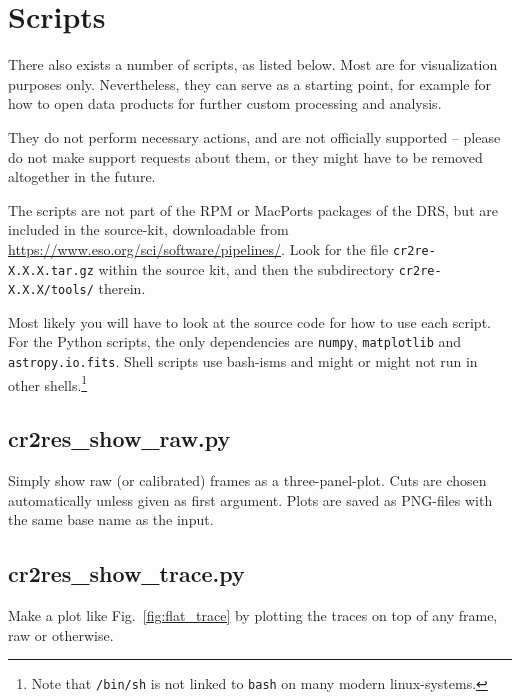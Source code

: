 \section{Scripts}
\label{sec:scripts}

There also exists a number of scripts, as listed below. Most are for visualization
purposes only. Nevertheless, they can serve as a starting point, for example for
how to open data products for further custom processing and analysis.

They do not perform necessary actions, and are not officially supported
-- please do not make support requests about them, or they might have to be
removed altogether in the future.

The scripts are not part of the RPM or MacPorts packages of the DRS, but are
included in the source-kit, downloadable from
\url{https://www.eso.org/sci/software/pipelines/}. Look for the file
\linebreak\verb!cr2re-X.X.X.tar.gz! within the source kit, and then the subdirectory
\verb!cr2re-X.X.X/tools/! therein.

Most likely you will have to look at the source code for how to use each script.
For the Python scripts, the only dependencies are \texttt{numpy},
\texttt{matplotlib} and \texttt{astropy.io.fits}. Shell scripts use bash-isms
and might or might not run in other shells.\footnote{Note that \texttt{/bin/sh}
is not linked to \texttt{bash} on many modern linux-systems.}


\subsection{cr2res\_show\_raw.py}
Simply show raw (or calibrated) frames as a three-panel-plot. Cuts are chosen automatically unless given as first argument. Plots are saved as PNG-files with the same base name as the input.
\begin{shell}
\end{shell}

\subsection{cr2res\_show\_trace.py}
Make a plot like Fig.~\ref{fig:flat_trace} by plotting the traces on top of any
frame, raw or otherwise.

